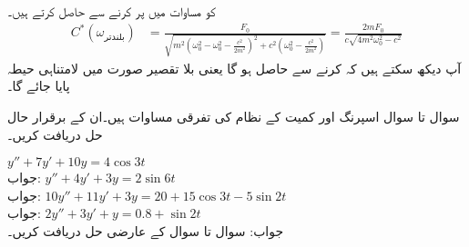  کو مساوات  میں پر کرنے سے  حاصل کرتے ہیں۔
\begin{align}
C^*(\omega_{\text{بلندتر}})&=\frac{F_0}{\sqrt{m^2(\omega_0^2-\omega_0^2-\frac{c^2}{2m^2})^2+c^2(\omega_0^2-\frac{c^2}{2m^2})}}=\frac{2mF_0}{c\sqrt{4m^2\omega_0^2-c^2}}
\end{align}
آپ دیکھ سکتے ہیں کہ  کرنے سے  حاصل ہو گا یعنی بلا تقصیر صورت میں لامتناہی حیطہ پایا جائے گا۔


سوال  تا سوال  اسپرنگ اور کمیت کے نظام کی تفرقی مساوات ہیں۔ان کے برقرار حال حل دریافت کریں۔

\quad
$y''+7y'+10y=4\cos 3t$\\
جواب:
\quad
$y''+4y'+3y=2\sin 6t$\\
جواب:
\quad
$10y''+11y'+3y=20+15\cos 3t-5\sin 2t$\\
جواب:
\quad
$2y''+3y'+y=0.8+\sin 2t$\\
جواب:
سوال  تا سوال  کے عارضی حل دریافت کریں۔

